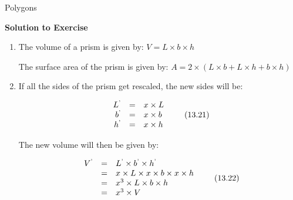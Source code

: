 \begin{exercises}{Polygons}
{\begin{mdframed}[linewidth=4, leftmargin=40, rightmargin=40]
\begin{exercise}
        
        \vspace{5pt}
        \label{m39357*solfhsst!!!underscore!!!id166}\noindent\textbf{Solution to Exercise } \label{m39357*listfhsst!!!underscore!!!id166}\begin{enumerate}[noitemsep, label=\textbf{Step} \textbf{\arabic*}. ] 
            \leftskip=20pt\rightskip=\leftskip\item  
        \label{m39357*id63750}The volume of a prism is given by:
$V=L\ensuremath{\times}b\ensuremath{\times}h$\par 
        \label{m39357*id63774}The surface area of the prism is given by:
$A=2\ensuremath{\times}\left(L\ensuremath{\times}b+L\ensuremath{\times}h+b\ensuremath{\times}h\right)$\par 
        \item  
        \label{m39357*id63826}If all the sides of the prism get rescaled, the new sides will be:\par 
        \label{m39357*id63830}\nopagebreak\noindent{}
          
    \begin{equation}
    \begin{array}{ccc}\hfill {L}^{\text{'}}& =& x\ensuremath{\times}L\hfill \\ \hfill {b}^{\text{'}}& =& x\ensuremath{\times}b\hfill \\ \hfill {h}^{\text{'}}& =& x\ensuremath{\times}h\hfill \end{array}\tag{13.21}
      \end{equation}
    
        
        \label{m39357*id63916}The new volume will then be given by:\par 
        \label{m39357*id63920}\nopagebreak\noindent{}
          
    \begin{equation}
    \begin{array}{ccc}\hfill {V}^{\text{'}}& =& {L}^{\text{'}}\ensuremath{\times}{b}^{\text{'}}\ensuremath{\times}{h}^{\text{'}}\hfill \\ & =& x\ensuremath{\times}L\ensuremath{\times}x\ensuremath{\times}b\ensuremath{\times}x\ensuremath{\times}h\hfill \\ & =& {x}^{3}\ensuremath{\times}L\ensuremath{\times}b\ensuremath{\times}h\hfill \\ & =& {x}^{3}\ensuremath{\times}V\hfill \end{array}\tag{13.22}
      \end{equation}
    

\end{enumerate}
\end{exercise}
\end{mdframed}}
\end{exercises}
